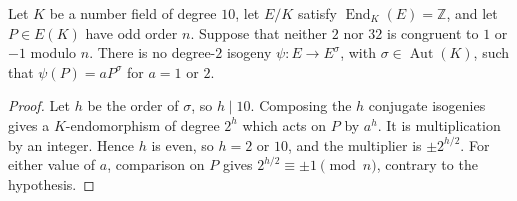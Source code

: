 \begin{lemma}\label{lem:decic-marked-two-cycle}
Let $K$ be a number field of degree $10$, let $E/K$ satisfy
$\operatorname{End}_K(E)=\mathbb Z$, and let $P\in E(K)$ have
odd order $n$. Suppose that neither $2$ nor $32$ is congruent to
$1$ or $-1$ modulo $n$. There is no degree-$2$ isogeny
$\psi:E\to E^\sigma$, with $\sigma\in\operatorname{Aut}(K)$,
such that $\psi(P)=aP^\sigma$ for $a=1$ or $2$.
\end{lemma}
\begin{proof}
Let $h$ be the order of $\sigma$, so $h\mid10$.
Composing the $h$ conjugate isogenies gives a $K$-endomorphism
of degree $2^h$ which acts on $P$ by $a^h$.
It is multiplication by an integer. Hence $h$ is even, so
$h=2$ or $10$, and the multiplier is $\pm2^{h/2}$.
For either value of $a$, comparison on $P$ gives
$2^{h/2}\equiv\pm1\pmod n$, contrary to the hypothesis.
\end{proof}

